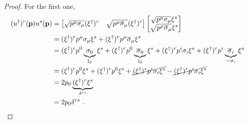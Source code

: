     \begin{proof}
        For the first one, 
        \begin{equation*}
        \begin{aligned}
            (u^\dagger)^r (\mathbf p) u^s (\mathbf p) & = \begin{bmatrix}
                \sqrt{p^\mu \sigma_\mu} (\xi^\dagger)^r & \sqrt{p^\mu \overline \sigma_\mu} (\xi^\dagger)^r \\
            \end{bmatrix} \begin{bmatrix}
                \sqrt{p^\mu \sigma_\mu} \xi^s \\ \sqrt{p^\mu \overline \sigma_\mu} \xi^s \\
            \end{bmatrix} \\ & = (\xi^\dagger)^r p^\mu \sigma_\mu \xi^s + (\xi^\dagger)^r p^\mu \overline \sigma_\mu \xi^s \\ & = (\xi^\dagger)^r p^0 \underbrace{\sigma_0}_{\mathbb I_2} \xi^s + (\xi^\dagger)^r p^0 \underbrace{\overline \sigma_0}_{\mathbb I_2} \xi^s + (\xi^\dagger)^r p^i \sigma_i \xi^s + (\xi^\dagger)^r p^i \underbrace{\overline \sigma_i}_{- \sigma_i} \xi^s \\ & = (\xi^\dagger)^r p^0 \xi^s + (\xi^\dagger)^r p^0 \xi^s + \cancel{(\xi^\dagger)^r p^i \sigma_i \xi^s } - \cancel{(\xi^\dagger)^r p^i \sigma_i \xi^s} \\ & = 2 p_0 \underbrace{(\xi^\dagger)^r \xi^s}_{\delta^{rs}} \\ & = 2 p_0 \delta^{rs} ~.
        \end{aligned}
        \end{equation*}


\end{proof}
